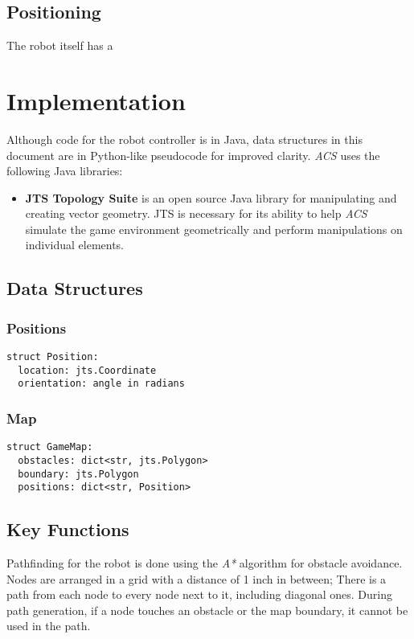 \documentclass{article}
\begin{document}
\subsection{Positioning}
The robot itself has a 
\section{Implementation}
Although code for the robot controller is in Java, data structures in this document are in Python-like pseudocode for improved clarity.
\emph{ACS} uses the following Java libraries:
\begin{itemize}
    \item \textbf{JTS Topology Suite} is an open source Java library for manipulating and creating vector geometry. JTS is necessary for its ability to help \emph{ACS} simulate the game environment geometrically and perform manipulations on individual elements.
\end{itemize}

\subsection{Data Structures}
\subsubsection{Positions}

\begin{verbatim}
struct Position:
  location: jts.Coordinate
  orientation: angle in radians
\end{verbatim}

\subsubsection{Map}
\begin{verbatim}
struct GameMap:
  obstacles: dict<str, jts.Polygon>
  boundary: jts.Polygon
  positions: dict<str, Position>
\end{verbatim}

\subsection{Key Functions}
Pathfinding for the robot is done using the \emph{A*} algorithm for obstacle avoidance. Nodes are arranged in a grid with a distance of 1 inch in between; There is a path from each node to every node next to it, including diagonal ones. During path generation, if a node touches an obstacle or the map boundary, it cannot be used in the path.
\end{document}

